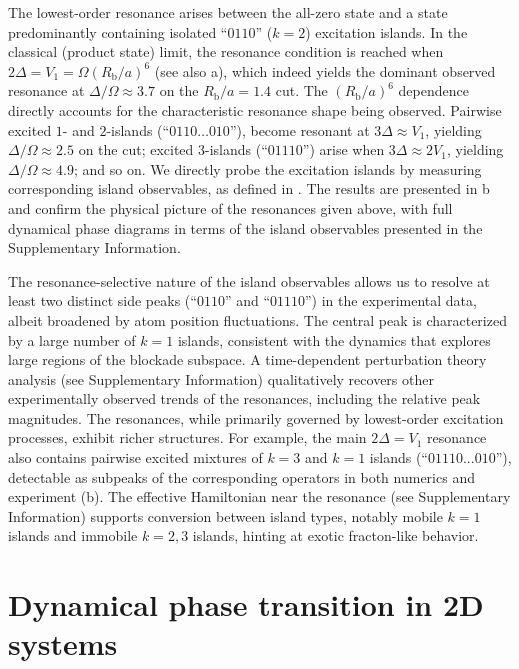 \documentclass[english,floatfix,twocolumn,showpacs, aps, prx, reprint, superscriptaddress, longbibliography]{revtex4-2}
\begin{document}
The lowest-order resonance arises between the all-zero state and a state predominantly containing isolated ``$0110$'' ($k=2$) excitation islands. In the classical (product state) limit, the resonance condition is reached when $2\Delta = V_1 = \Omega (R_\mathrm{b}/a)^6$ (see also a), which indeed yields the dominant observed resonance at $\Delta/\Omega \approx 3.7$ on the $R_\mathrm{b}/a = 1.4$ cut. The $(R_\mathrm{b}/a)^6$ dependence directly accounts for the characteristic resonance shape being observed. Pairwise excited $1$- and $2$-islands (``$0110 \hdots 010$''), become resonant at $3 \Delta \approx V_1$, yielding $\Delta / \Omega \approx 2.5$ on the cut; excited $3$-islands (``$01110$'') arise when $3 \Delta \approx  2 V_1$, yielding $\Delta / \Omega \approx 4.9$; and so on. We directly probe the excitation islands by measuring corresponding island observables, as defined in . The results are presented in b and confirm the physical picture of the resonances given above, with full dynamical phase diagrams in terms of the island observables presented in the Supplementary Information. 

The resonance-selective nature of the island observables allows us to resolve at least two distinct side peaks (``$0110$'' and ``$01110$'') in the experimental data, albeit broadened by atom position fluctuations. The central peak is characterized by a large number of $k=1$ islands, consistent with the dynamics that explores large regions of the blockade subspace. A time-dependent perturbation theory analysis (see Supplementary Information) qualitatively recovers other experimentally observed trends of the resonances, including the relative peak magnitudes. The resonances, while primarily governed by lowest-order excitation processes, exhibit richer structures. For example, the main $2\Delta = V_1$ resonance also contains pairwise excited mixtures of $k=3$ and $k=1$ islands (``$01110...010$''), detectable as subpeaks of the corresponding operators in both numerics and experiment (b). The effective Hamiltonian near the resonance (see Supplementary Information) supports conversion between island types, notably mobile $k=1$ islands and immobile $k=2,3$ islands, hinting at exotic fracton-like behavior.


\section*{Dynamical phase transition in 2D systems}
\label{sec:2D_results}
\end{document}
